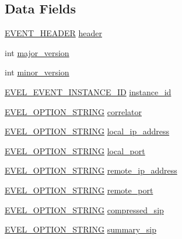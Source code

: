 \subsection*{Data Fields}
\begin{DoxyCompactItemize}
\item 
\hyperlink{evel_8h_aa0ea94c675729365ea7825c4fc7e06d8}{E\+V\+E\+N\+T\+\_\+\+H\+E\+A\+D\+ER} \hyperlink{structevent__signaling_a377b3d5429de73e7bbea25127b02fc2d}{header}
\item 
int \hyperlink{structevent__signaling_a39eb0a8539062056a825729b201e3bc1}{major\+\_\+version}
\item 
int \hyperlink{structevent__signaling_a1053cdae6a8de9f6afc93bacdb594291}{minor\+\_\+version}
\item 
\hyperlink{evel_8h_a4569c7e4bcb933caf47237a323d7c872}{E\+V\+E\+L\+\_\+\+E\+V\+E\+N\+T\+\_\+\+I\+N\+S\+T\+A\+N\+C\+E\+\_\+\+ID} \hyperlink{structevent__signaling_a27b94664bb47c81dd1364c5ec7d908ca}{instance\+\_\+id}
\item 
\hyperlink{evel_8h_a0de5113a7b72de93c0c7b644f7ea7ec3}{E\+V\+E\+L\+\_\+\+O\+P\+T\+I\+O\+N\+\_\+\+S\+T\+R\+I\+NG} \hyperlink{structevent__signaling_a09e069c4e08e64e20bb28f174774a80d}{correlator}
\item 
\hyperlink{evel_8h_a0de5113a7b72de93c0c7b644f7ea7ec3}{E\+V\+E\+L\+\_\+\+O\+P\+T\+I\+O\+N\+\_\+\+S\+T\+R\+I\+NG} \hyperlink{structevent__signaling_a2d73638b925f684967ecc34786e4ef7d}{local\+\_\+ip\+\_\+address}
\item 
\hyperlink{evel_8h_a0de5113a7b72de93c0c7b644f7ea7ec3}{E\+V\+E\+L\+\_\+\+O\+P\+T\+I\+O\+N\+\_\+\+S\+T\+R\+I\+NG} \hyperlink{structevent__signaling_af51af033e7d7e598456ca984d2529ce2}{local\+\_\+port}
\item 
\hyperlink{evel_8h_a0de5113a7b72de93c0c7b644f7ea7ec3}{E\+V\+E\+L\+\_\+\+O\+P\+T\+I\+O\+N\+\_\+\+S\+T\+R\+I\+NG} \hyperlink{structevent__signaling_a0d9f1983732f3fd977ffac5518621e90}{remote\+\_\+ip\+\_\+address}
\item 
\hyperlink{evel_8h_a0de5113a7b72de93c0c7b644f7ea7ec3}{E\+V\+E\+L\+\_\+\+O\+P\+T\+I\+O\+N\+\_\+\+S\+T\+R\+I\+NG} \hyperlink{structevent__signaling_ab8971e59fbf1c299b8e65f3f0a60f63e}{remote\+\_\+port}
\item 
\hyperlink{evel_8h_a0de5113a7b72de93c0c7b644f7ea7ec3}{E\+V\+E\+L\+\_\+\+O\+P\+T\+I\+O\+N\+\_\+\+S\+T\+R\+I\+NG} \hyperlink{structevent__signaling_ad1e58e43b9970157b410b4c192237824}{compressed\+\_\+sip}
\item 
\hyperlink{evel_8h_a0de5113a7b72de93c0c7b644f7ea7ec3}{E\+V\+E\+L\+\_\+\+O\+P\+T\+I\+O\+N\+\_\+\+S\+T\+R\+I\+NG} \hyperlink{structevent__signaling_a47b6337540003f1cd24ba4a05b514fa0}{summary\+\_\+sip}
\end{DoxyCompactItemize}


